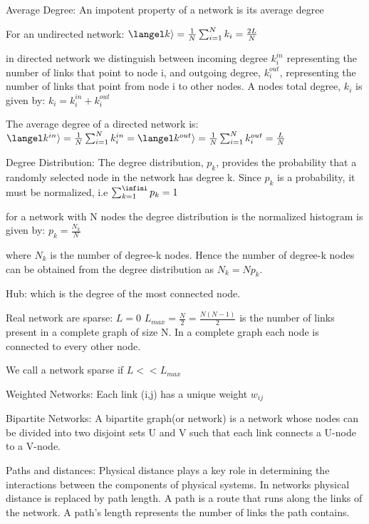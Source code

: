 Average Degree: 
    An impotent property of a network is its average degree 
    
    For an undirected network: 
    $\langel k \rangle = \frac{1}{N} \sum_{i=1}^{N}k_i = \frac{2L}{N}$
    
    in directed network we distinguish between incoming degree $k_i^{in}$ representing the number of links that point to node i, and outgoing degree, $k_i^{out}$, representing the number of links that point from node i to other nodes. A nodes total degree, $k_i$ is given by: 
    $k_i=k_i^{in} + k_i^{out}$
    
    The average degree of a directed network is: 
    $\langel k^{in} \rangle = \frac{1}{N} \sum_{i=1}^{N}k_i^{in} = \langel k^{out}\rangle = \frac{1}{N} \sum_{i=1}^{N}k_i^{out} = \frac{L}{N}$

Degree Distribution: 
    The degree distribution, $p_k$, provides the probability that a randomly selected node in the network has degree k. Since $p_k$ is a probability, it must be normalized, i.e 
    $\sum_{k=1}^{\infini} p_k = 1$
    
    for a network with N nodes the degree distribution is the normalized histogram is given by: 
    $p_k= \frac{N_k}{N}$
    
    where $N_k$ is the number of degree-k nodes. Hence the number of degree-k nodes can be obtained from the degree distribution as $N_k=Np_k$. 

Hub: which is the degree of the most connected node. 

Real network are sparse:
    $L=0$ $L_{max}=\frac{N}{2}=\frac{N(N-1)}{2}$ is the number of links present in a complete graph of size N. In a complete graph each node is connected to every other node. 
    
    We call a network sparse if $L<< L_{max}$

Weighted Networks:
    Each link (i,j) has a unique weight $w_{ij}$

Bipartite Networks: 
    A bipartite graph(or network) is a network whose nodes can be divided into two disjoint sets U and V such that each link connects a U-node to a V-node. 

Paths and distances: 
    Physical distance plays a key role in determining the interactions between the components of physical systems. 
    In networks physical distance is replaced by path length. A path is a route that runs along the links of the network. A path's length represents the number of links the path contains. 

